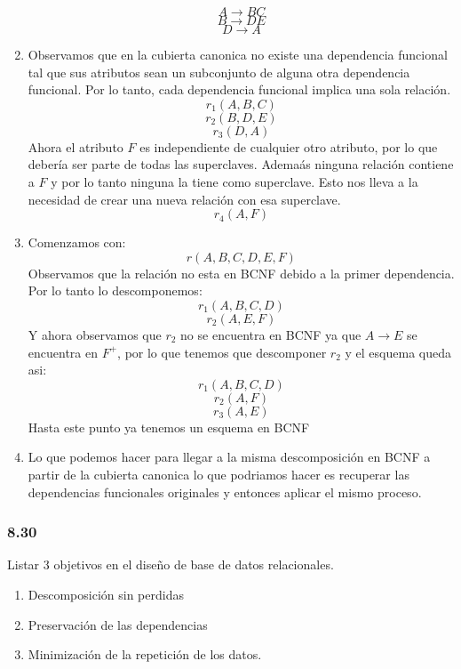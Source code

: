 \documentclass[twoside]{article}
\begin{document}
\begin{enumerate}
            $$A \rightarrow BC$$
            $$B \rightarrow DE$$
            $$D \rightarrow A$$
      \item Observamos que en la cubierta canonica no existe una dependencia funcional tal que sus atributos sean un subconjunto de alguna otra
            dependencia funcional. Por lo tanto, cada dependencia funcional implica una sola relaci\'on.
            $$r_1(A, B, C)$$
            $$r_2(B, D, E)$$
            $$r_3(D, A)$$
            Ahora el atributo $F$ es independiente de cualquier otro atributo, por lo que deber\'ia ser parte de todas las superclaves.
            Adema\'as ninguna relaci\'on contiene a $F$ y por lo tanto ninguna la tiene como superclave. Esto nos lleva a la necesidad
            de crear una nueva relaci\'on con esa superclave.
            $$r_4(A, F)$$
      \item Comenzamos con:
            $$r(A, B, C, D, E, F)$$
            Observamos que la relaci\'on no esta en BCNF debido a la primer dependencia. Por lo tanto lo descomponemos:
            $$r_1(A, B, C, D)$$
            $$r_2(A, E, F)$$
            Y ahora observamos que $r_2$ no se encuentra en BCNF ya que $A \rightarrow E$ se encuentra en $F^+$, por lo que tenemos que descomponer
            $r_2$ y el esquema queda asi:
            $$r_1(A, B, C, D)$$
            $$r_2(A, F)$$
            $$r_3(A, E)$$
            Hasta este punto ya tenemos un esquema en BCNF
      \item Lo que podemos hacer para llegar a la misma descomposici\'on en BCNF a partir de la cubierta canonica lo que podriamos hacer es recuperar
            las dependencias funcionales originales y entonces aplicar el mismo proceso.
\end{enumerate}
\subsubsection*{8.30}
Listar 3 objetivos en el diseño de base de datos relacionales.\\
\begin{enumerate}
      \item Descomposición sin perdidas
      \item Preservación de las dependencias
      \item Minimizaci\'on de la repetici\'on de los datos.
\end{enumerate}

\end{document}
